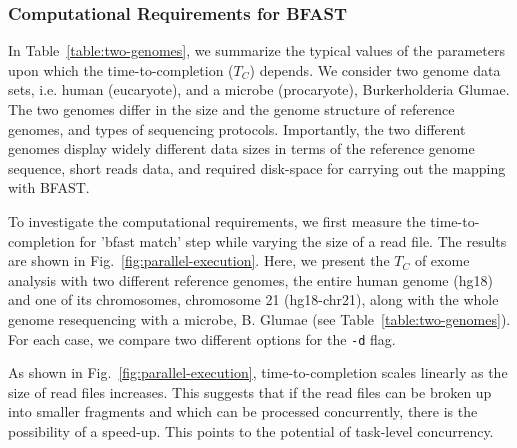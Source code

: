 \documentclass{cpeauth}
\begin{document}

\subsubsection{Computational Requirements for BFAST}


In Table~\ref{table:two-genomes}, we summarize the typical values of
the parameters upon which the time-to-completion ($T_C$) depends. 
We consider two genome data sets, i.e. human (eucaryote), and a microbe
(procaryote), Burkerholderia Glumae\cite{kim2011}.  The two genomes
differ in the size and the genome structure of reference genomes, and
types of sequencing protocols.  Importantly, the two different genomes
display widely different data sizes in terms of the reference genome
sequence, short reads data, and required disk-space for carrying out
the mapping with BFAST.


To investigate the computational requirements, we first measure the
time-to-completion for 'bfast match' step while varying the size of a
read file.  The results are shown in
Fig.~\ref{fig:parallel-execution}. %
Here, we present the $T_C$ of exome analysis with two different
reference genomes, the entire human genome (hg18) and one of its
chromosomes, chromosome 21 (hg18-chr21), along with the whole genome
resequencing with a microbe, B. Glumae\cite{kim2011} (see
Table~\ref{table:two-genomes}).  For each case, we compare two
different options for the \texttt{-d} flag.

As shown in Fig.~\ref{fig:parallel-execution}, time-to-completion
scales linearly as the size of read files increases.  This suggests
that if the read files can be broken up into smaller fragments and
which can be processed concurrently, there is the possibility of a
speed-up. This points to the potential of task-level concurrency.
\end{document}
